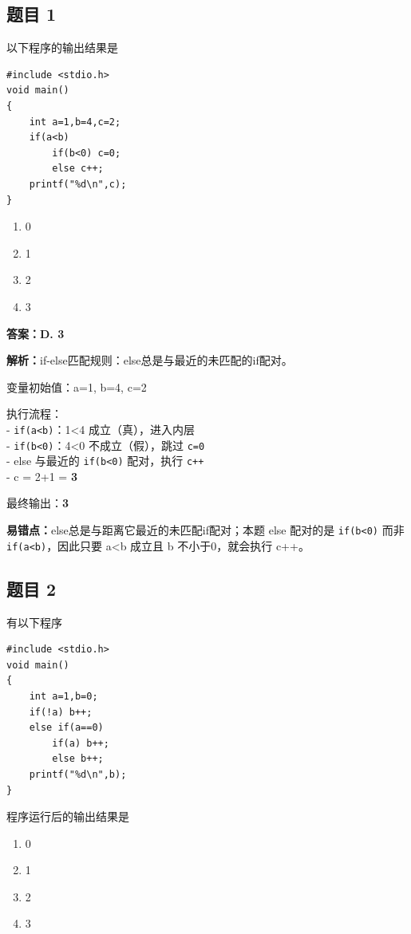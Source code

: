 \documentclass[12pt,a4paper]{ctexart}
\begin{document}
\subsection*{题目 1}
以下程序的输出结果是
\begin{lstlisting}
#include <stdio.h>
void main()
{
    int a=1,b=4,c=2;
    if(a<b)
        if(b<0) c=0;
        else c++;
    printf("%d\n",c);
}
\end{lstlisting}

\begin{enumerate}[label=\Alph*.]
	\item 0
	\item 1
	\item 2
	\item 3
\end{enumerate}

\begin{answerbox}
	\textbf{答案：D. 3}

	\textbf{解析：}if-else匹配规则：else总是与最近的未匹配的if配对。

	变量初始值：a=1, b=4, c=2

	执行流程：\\
	- \texttt{if(a<b)}：1<4 成立（真），进入内层\\
	- \texttt{if(b<0)}：4<0 不成立（假），跳过 \texttt{c=0}\\
	- else 与最近的 \texttt{if(b<0)} 配对，执行 \texttt{c++}\\
	- c = 2+1 = \textbf{3}

	最终输出：\textbf{3}

	\textbf{易错点：}else总是与距离它最近的未匹配if配对；本题 else 配对的是 \texttt{if(b<0)} 而非 \texttt{if(a<b)}，因此只要 a<b 成立且 b 不小于0，就会执行 c++。
\end{answerbox}

\subsection*{题目 2}
有以下程序
\begin{lstlisting}
#include <stdio.h>
void main()
{
    int a=1,b=0;
    if(!a) b++;
    else if(a==0)
        if(a) b++;
        else b++;
    printf("%d\n",b);
}
\end{lstlisting}

程序运行后的输出结果是
\begin{enumerate}[label=\Alph*.]
	\item 0
	\item 1
	\item 2
	\item 3
\end{enumerate}
\end{document}
